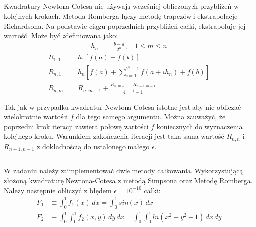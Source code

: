 \documentclass[11pt]{extarticle}
\begin{document}
	\subsection{}
	Kwadratury Newtona-Cotesa nie używają wcześniej obliczonych przybliżeń w kolejnych krokach.
	Metoda Romberga łączy metodę trapezów i ekstrapolacje Richardsona.
	Na podstawie ciągu poprzednich przybliżeń całki, ekstrapoluje jej wartość.
	Może być zdefiniowana jako:
	\begin{align}
		h_n &= \frac{b-a}{2^n}, \quad 1 \leq m \leq n
	\end{align}
	\begin{align}
		R_{1,1} &= h_1 \left[ f(a) + f(b) \right] \\[0.3cm]
		R_{n,1} &= h_n \left[ f(a) + \sum_{i=1}^{2^n-1}f(a + ih_n) + f(b) \right] \\[0.3cm]
		R_{n,m} &= R_{n,m-1} + \frac{R_{n,m-1} - R_{n-1,m-1}}{4^{m-1} - 1}
	\end{align}

	Tak jak w przypadku kwadratur Newtona-Cotesa istotne jest aby nie obliczać wielokrotnie wartości \(f\) dla tego samego argumentu.
	Można zauważyć, że poprzedni krok iteracji zawiera połowę wartości \(f\) koniecznych do wyznaczenia kolejnego kroku.
	Warunkiem zakończenia iteracji jest taka sama wartość \(R_{n,n}\) i \(R_{n-1, n-1}\) z dokładnością do ustalonego małego \(\epsilon\).

	\subsection{}
	W zadaniu należy zaimplementować dwie metody całkowania.
	Wykorzystującą złożoną kwadraturę Newtona-Cotesa z metodą Simpsona oraz Metodę Romberga.
	Należy następnie obliczyć z błędem \(\epsilon = 10^{-10}\) całki:
	\begin{align}
		F_1 &\equiv \int_0^1 f_1(x)\,dx
		= \int_0^1 sin(x)\,dx \\
		F_2 &\equiv \int_0^1 \int_0^1 f_2(x, y)\,dy\,dx
		= \int_0^1 \int_0^1 ln(x^2 + y^2 + 1)\,dx\,dy
	\end{align}
\end{document}
